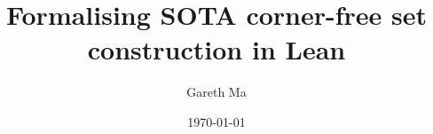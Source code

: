 \documentclass{article}[11px]
\title{Formalising SOTA corner-free set construction in Lean}
\author{Gareth Ma}
\date{\today}
\begin{document}
 \maketitle

\begin{abstract}
  ~\cite{GreenTao12} \lipsum[1]
\end{abstract}

\tableofcontents

\pagebreak

% 
% 
% 



% 
% 
% 
% 
% 


% 
% 

\clearpage
\printbibliography
\end{document}
